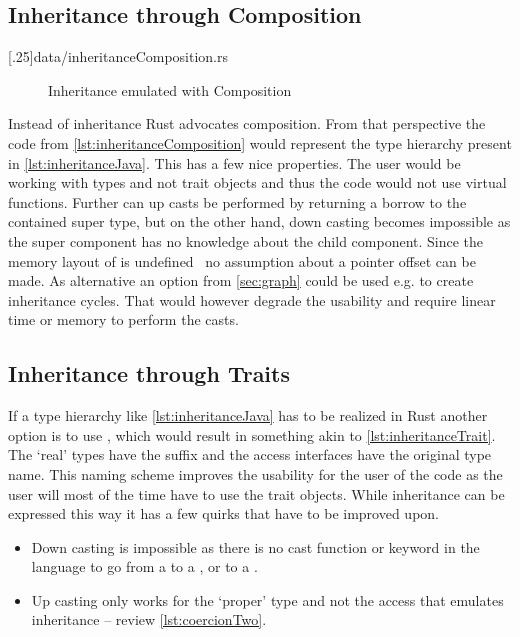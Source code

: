 \documentclass[thesis]{subfiles}
\begin{document}
  \subsection{Inheritance through Composition}%
    \LstTikzBox{\inheritanceComposition}[.25\linewidth]{data/inheritanceComposition.rs}
    \begin{wrapfigure}{r}{0.38\textwidth}%
      \vspace*{-\baselineskip}%
      \captionsetup{type=lstlisting}%
      \begin{center}%
        \usebox{\inheritanceComposition}%
      \end{center}%
      \vspace*{-\baselineskip}%
      \caption{Inheritance emulated with Composition}\label{lst:inheritanceComposition}%
    \end{wrapfigure}%
    Instead of inheritance Rust advocates composition.
    From that perspective the code from \autoref{lst:inheritanceComposition} would represent the type hierarchy present in \autoref{lst:inheritanceJava}.
    This has a few nice properties.
    The user would be working with types and not trait objects and thus the code would not use virtual functions.
    Further can up casts be performed by returning a borrow to the contained super type, but on the other hand, down casting becomes impossible as the super component has no knowledge about the child component.
    Since the memory layout of \structs is undefined~\autocite[0079-undefined-struct-layout]{rust-rfc} no assumption about a pointer offset can be made.
    As alternative an option from \autoref{sec:graph} could be used e.g.  to create inheritance cycles.
    That would however degrade the usability and require linear time or memory to perform the casts.

  \subsection{Inheritance through Traits}\label{sec:magic}
    If a type hierarchy like \autoref{lst:inheritanceJava} has to be realized in Rust another option is to use \traits, which would result in something akin to \autoref{lst:inheritanceTrait}.
    The `real' types have the suffix  and the access interfaces have the original type name.
    This naming scheme improves the usability for the user of the code as the user will most of the time have to use the trait objects.
    While inheritance can be expressed this way it has a few quirks that have to be improved upon.
    \begin{itemize}
      \item Down casting is impossible as there is no cast function or keyword in the language to go from a \trait to a \struct, or to a \trait.
      \item Up casting only works for the `proper' type and not the access \trait that emulates inheritance -- review \autoref{lst:coercionTwo}.
    \end{itemize}
\end{document}
